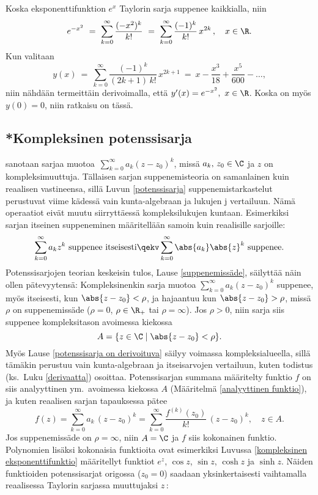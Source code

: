 \ratk Koska eksponenttifunktion $e^x$ Taylorin sarja suppenee kaikkialla, niin
\[ 
e^{-x^2}\ =\ \sum_{k=0}^\infty \frac{(-x^2)^k}{k!}\ 
          =\ \sum_{k=0}^\infty \frac{(-1)^k}{k!}\,x^{2k}\,, \quad x \in \R. 
\]
Kun valitaan
\[ 
y(x)\ =\ \sum_{k=0}^\infty \frac{(-1)^k}{(2k+1)\,k!}\,x^{2k+1}\ 
      =\ x - \frac{x^3}{18} + \frac{x^5}{600} - \ldots, 
\]
niin nähdään termeittäin derivoimalla, että $y'(x)=e^{-x^2},\ x\in\R$. Koska on myös $y(0)=0$,
niin ratkaisu on tässä. \loppu

\subsection*{*Kompleksinen potenssisarja}

 sanotaan sarjaa muotoa 
$\,\sum_{k=0}^\infty a_k (z-z_0)^k$, missä $a_k,\,z_0 \in \C$ ja $z$ on kompleksimuuttuja. 
Tällaisen sarjan suppenemisteoria on samanlainen kuin reaalisen vastineensa, sillä Luvun 
\ref{potenssisarja} suppenemistarkastelut perustuvat viime kädessä vain kunta-algebraan ja 
lukujen \pain{itseisarvo}j\pain{en} vertailuun. Nämä operaatiot eivät muutu siirryttäessä 
kompleksilukujen kuntaan. Esimerkiksi sarjan itseinen suppeneminen määritellään samoin kuin 
reaalisille sarjoille:
\[ 
\sum_{k=0}^\infty a_k z^k\ \text{suppenee itseisesti} 
              \qekv \sum_{k=0}^\infty \abs{a_k}\abs{z}^k\ \text{suppenee}. 
\]
Potenssisarjojen teorian keskeisin tulos, Lause \ref{suppenemissäde}, säilyttää näin ollen 
pätevyytensä: Kompleksinenkin sarja muotoa $\sum_{k=0}^\infty a_k (z-z_0)^k$ suppenee, myös 
itseisesti, kun $\abs{z-z_0}<\rho$, ja hajaantuu kun $\abs{z-z_0}>\rho$, missä $\rho$ on 
suppenemissäde ($\rho=0$, $\rho \in \R_+$ tai $\rho=\infty$). Jos $\rho>0$, niin sarja siis 
suppenee kompleksitason avoimessa kiekossa
\[ 
A = \{z \in \C \mid \abs{z-z_0} < \rho\}. 
\]
Myös Lause \ref{potenssisarja on derivoituva} säilyy voimassa kompleksialueella, sillä tämäkin
perustuu vain kunta-algebraan ja itseisarvojen vertailuun, kuten todistus 
(ks.\ Luku \ref{derivaatta}) osoittaa. Potenssisarjan summana määritelty funktio $f$
on siis analyyttinen ym.\ avoimessa kiekossa $A$ (Määritelmä \ref{analyyttinen funktio}), ja
kuten reaalisen sarjan tapauksessa pätee
\[
f(z) = \sum_{k=0}^\infty a_k\,(z-z_0)^k 
     = \sum_{k=0}^\infty \dfrac{f^{(k)}(z_0)}{k!}\,(z-z_0)^k, \quad z \in A.
\]
Jos suppenemissäde on $\rho=\infty$, niin $A=\C$ ja $f$ siis kokonainen funktio. Polynomien
lisäksi kokonaisia funktioita ovat esimerkiksi Luvussa \ref{kompleksinen eksponenttifunktio}
määritellyt funktiot $e^z$, $\cos z$, $\sin z$, $\cosh z$ ja $\sinh z$. Näiden funktioiden
potenssisarjat origossa ($z_0=0$) saadaan yksinkertaisesti vaihtamalla reaalisessa Taylorin
sarjassa muuttujaksi $z\,$:

